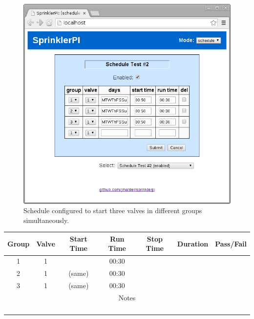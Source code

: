 \documentclass{article}
\begin{document}
\begin{enumerate}
	\begin{figure}[hbp!]
	\begin{center}
	\includegraphics[scale=0.5]{img/www-schedule_test2}
	\end{center}
	\caption{Schedule configured to start three valves in different groups
		simultaneously.}
	\label{fig:www-schedule_test2}
	\end{figure}

	\vspace{1em}
	\begin{center}
	\begin{tabular}{|c|c|c|c|c|c|c|}
		\hline
		Group & Valve & Start Time & Run Time & Stop Time & Duration & Pass/Fail \\
		\hline
		1 & 1 & & 00:30 & & & \hspace{4em} \\
		\hline
		2 & 1 & (same) & 00:30 & & & \\
		\hline
		3 & 1 & (same) & 00:30 & & & \\
		\hline
		\hline
		\multicolumn{7}{|c|}{Notes} \\
		\multicolumn{7}{|c|}{} \\
		\multicolumn{7}{|c|}{} \\
		\multicolumn{7}{|c|}{} \\
		\multicolumn{7}{|c|}{} \\
		\hline
	\end{tabular}
	\end{center}

\end{enumerate}

\FloatBarrier



\clearpage
\printbibliography[heading=bibintoc]
\end{document}
